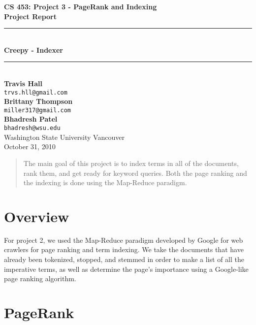 \documentclass[letterpaper,11pt,twoside]{article}
\begin{document}
\begin{titlepage}
   \begin{center}
       {\Large \textbf{CS 453: Project 3 - PageRank and Indexing}}\\[0.5cm]
       {\Large \textbf{Project Report}}\\[3.0cm]

       {\rule{\linewidth}{0.5mm}} \\[0.5cm]
       {\Huge \textbf{Creepy - Indexer}}\\[0.4cm] 
       {\rule{\linewidth}{0.5mm}} \\[2.0cm]

       \textbf{Travis Hall}\\
       \texttt{trvs.hll@gmail.com}\\[0.5cm]
       \textbf{Brittany Thompson}\\
       \texttt{miller317@gmail.com}\\[0.5cm]
       \textbf{Bhadresh Patel}\\
       \texttt{bhadresh@wsu.edu}\\[0.5cm]

       \vfill
       Washington State University Vancouver\\
       October 31, 2010
   \end{center}
\end{titlepage}

\begin{abstract}
The main goal of this project is to index terms in all of the documents, rank them, and get ready for keyword queries. Both the page ranking and the indexing is done using the Map-Reduce paradigm.
\end{abstract}

\section{Overview}
For project 2, we used the Map-Reduce paradigm developed by Google for web crawlers for page ranking and term indexing. We take the documents that have already been tokenized, stopped, and stemmed in order to make a list of all the imperative terms, as well as determine the page’s importance using a Google-like page ranking algorithm.

\section{PageRank}
\end{document}
